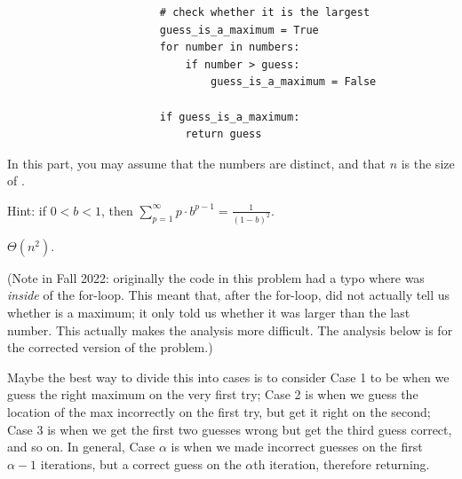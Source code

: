 \begin{prob}
\begin{subprobset}
\begin{subprob}
\begin{verbatim}
                        # check whether it is the largest
                        guess_is_a_maximum = True
                        for number in numbers:
                            if number > guess:
                                guess_is_a_maximum = False

                        if guess_is_a_maximum:
                            return guess
            \end{verbatim}

            In this part, you may assume that the numbers are distinct, and that $n$ is the size
            of .

            Hint: if $0 < b < 1$, then $\sum_{p = 1}^\infty p \cdot b^{p-1} = \frac{1}{(1 - b)^2}$.

            \begin{soln}
                $\Theta(n^2)$.

                (Note in Fall 2022: originally the code in this problem had a typo where 
                was \emph{inside} of the for-loop. This meant that, after the for-loop,  did not
                actually tell us whether  is a maximum; it only told us whether it was larger than the last
                number. This actually makes the analysis more difficult. The
                analysis below is for the corrected version of the problem.)

                Maybe the best way to divide this into cases is to consider Case 1 to
                be when we guess the right maximum on the very first try;
                Case 2 is when we guess the location of the max incorrectly on the
                first try, but get it right on the second; Case 3 is when we get the
                first two guesses wrong but get the third guess correct, and so on.
                In general, Case $\alpha$ is when we made incorrect guesses on the first
                $\alpha - 1$ iterations, but a correct guess on the $\alpha$th iteration,
                therefore returning.


\end{soln}
\end{subprob}
\end{subprobset}
\end{prob}
